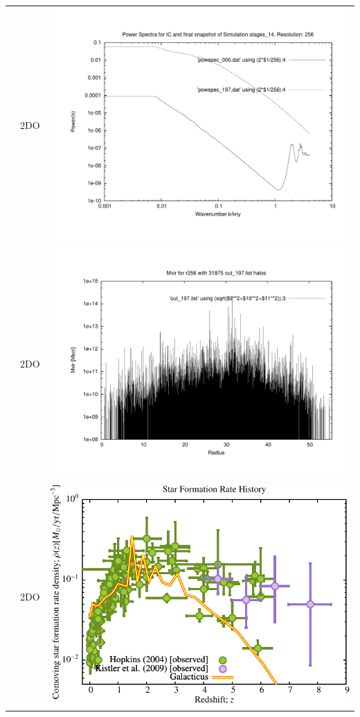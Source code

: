 \begin{itemize}
\begin{table}[p]
\begin{tabular}{l|c|c}
 & 2DO & \includegraphics[scale=0.25]{r256/h100/stages_14/plot_powspec_stages_14.pdf} \\
 & 2DO & \includegraphics[scale=0.25]{r256/h100/stages_14/plot_mvir_out_197.pdf} \\
 & 2DO & \includegraphics[scale=0.5]{r256/h100/stages_14/Plot_Star_Formation_History.pdf} \\

\end{tabular}
\end{table}
\end{itemize}
